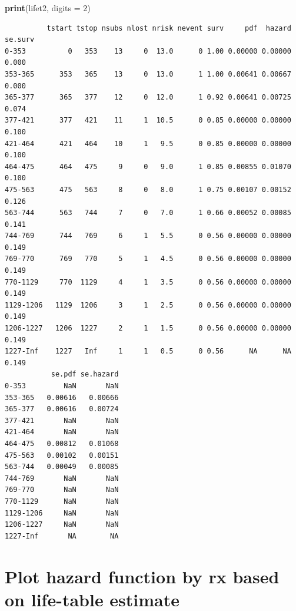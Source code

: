 \documentclass[
]{article}
\newenvironment{Shaded}{\begin{snugshade}}{\end{snugshade}}
\newcommand{\AttributeTok}[1]{\textcolor[rgb]{0.13,0.29,0.53}{#1}}
\newcommand{\DecValTok}[1]{\textcolor[rgb]{0.00,0.00,0.81}{#1}}
\newcommand{\FunctionTok}[1]{\textcolor[rgb]{0.13,0.29,0.53}{\textbf{#1}}}
\newcommand{\NormalTok}[1]{#1}
\begin{document}
\begin{Shaded}
\begin{Highlighting}[]
\FunctionTok{print}\NormalTok{(lifet2, }\AttributeTok{digits =} \DecValTok{2}\NormalTok{)}
\end{Highlighting}
\end{Shaded}

\begin{verbatim}
          tstart tstop nsubs nlost nrisk nevent surv     pdf  hazard se.surv
0-353          0   353    13     0  13.0      0 1.00 0.00000 0.00000   0.000
353-365      353   365    13     0  13.0      1 1.00 0.00641 0.00667   0.000
365-377      365   377    12     0  12.0      1 0.92 0.00641 0.00725   0.074
377-421      377   421    11     1  10.5      0 0.85 0.00000 0.00000   0.100
421-464      421   464    10     1   9.5      0 0.85 0.00000 0.00000   0.100
464-475      464   475     9     0   9.0      1 0.85 0.00855 0.01070   0.100
475-563      475   563     8     0   8.0      1 0.75 0.00107 0.00152   0.126
563-744      563   744     7     0   7.0      1 0.66 0.00052 0.00085   0.141
744-769      744   769     6     1   5.5      0 0.56 0.00000 0.00000   0.149
769-770      769   770     5     1   4.5      0 0.56 0.00000 0.00000   0.149
770-1129     770  1129     4     1   3.5      0 0.56 0.00000 0.00000   0.149
1129-1206   1129  1206     3     1   2.5      0 0.56 0.00000 0.00000   0.149
1206-1227   1206  1227     2     1   1.5      0 0.56 0.00000 0.00000   0.149
1227-Inf    1227   Inf     1     1   0.5      0 0.56      NA      NA   0.149
           se.pdf se.hazard
0-353         NaN       NaN
353-365   0.00616   0.00666
365-377   0.00616   0.00724
377-421       NaN       NaN
421-464       NaN       NaN
464-475   0.00812   0.01068
475-563   0.00102   0.00151
563-744   0.00049   0.00085
744-769       NaN       NaN
769-770       NaN       NaN
770-1129      NaN       NaN
1129-1206     NaN       NaN
1206-1227     NaN       NaN
1227-Inf       NA        NA
\end{verbatim}

\hypertarget{plot-hazard-function-by-rx-based-on-life-table-estimate}{%
\section{Plot hazard function by rx based on life-table
estimate}\label{plot-hazard-function-by-rx-based-on-life-table-estimate}}
\end{document}
